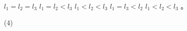 \begin{QUESTIONS}
\begin{QUESTION}
\begin{QBODY}
\begin{QOPS}
				\QOP $l_1=l_2=l_3$ 
				\QOP $l_1=l_2<l_3$
				\QOP $l_1<l_2<l_3$ 
				\QOP $l_1=l_3<l_2$ 
				\QOP $l_1<l_2<l_3$ 。
			\end{QOPS}
        \end{QBODY}
        \begin{QFROMS}
        \end{QFROMS}
        \begin{QTAGS}\end{QTAGS}
        \begin{QANS}
            (4)
        \end{QANS}
        \begin{QSOLLIST}
        \end{QSOLLIST}
        \begin{QEMPTYSPACE}
        \end{QEMPTYSPACE}
    \end{QUESTION}
\end{QUESTIONS}

